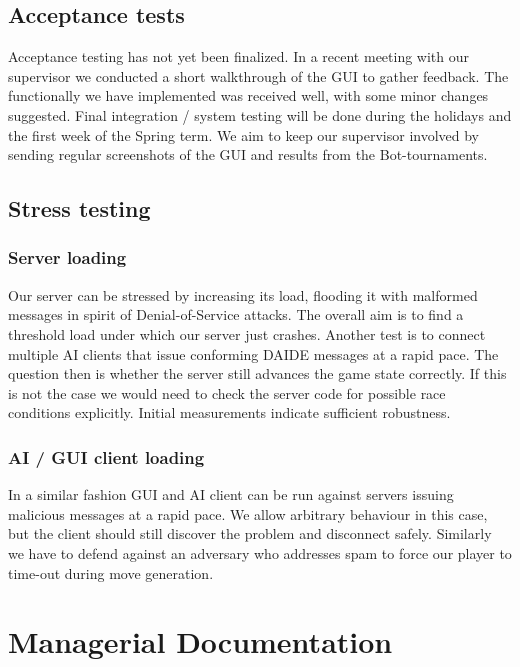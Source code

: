 \documentclass[11pt]{article}
\begin{document}
\subsection{Acceptance tests}
Acceptance testing has not yet been finalized. In a recent meeting 
with our supervisor we conducted a short walkthrough of the GUI to gather
feedback. The functionally we have implemented was received well, with some
minor changes suggested. Final integration / system testing will be done 
during the holidays and the first week of the Spring term. We aim to keep
our supervisor involved by sending regular screenshots of the GUI and 
results from the Bot-tournaments.

\subsection{Stress testing}

\subsubsection{Server loading}

Our server can be stressed by increasing its load, flooding it with malformed
messages in spirit of Denial-of-Service attacks. The overall aim is 
to find a threshold load under which our server just crashes. Another test is
to connect multiple AI clients that issue conforming DAIDE messages at a rapid
pace. The question then is whether the server still advances the game state
correctly. If this is not the case we would need to check the server code for
possible race conditions explicitly. Initial measurements indicate sufficient
robustness. 

\subsubsection{AI / GUI client loading}

In a similar fashion GUI and AI client can be run against servers issuing 
malicious messages at a rapid pace. We allow arbitrary behaviour in this
case, but the client should still discover the problem and disconnect 
safely. Similarly we have to defend against an adversary who addresses spam
to force our player to time-out during move generation.   

\section{Managerial Documentation}
\end{document}
